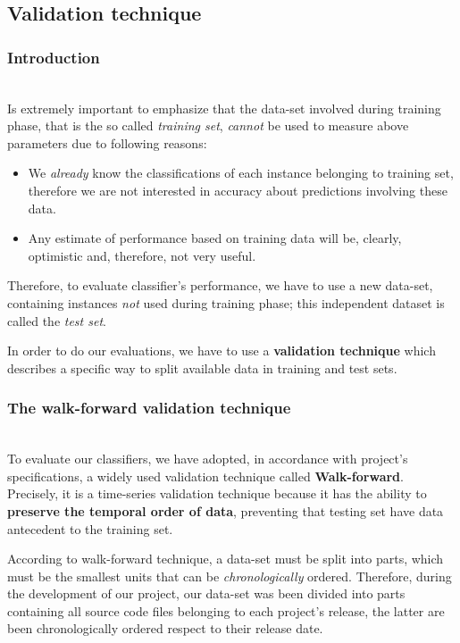\documentclass[sigconf]{acmart}
\begin{document}
\subsection{Validation technique}

\subsubsection{Introduction}
\hfill\\


Is extremely important to emphasize that the data-set involved during training phase, that is the so called \textit{training set}, \textit{cannot} be used to measure above parameters due to following reasons:
\begin{itemize}

\item We \textit{already} know the classifications of each instance belonging to training set, therefore we are not interested in accuracy about predictions involving these data.

\item Any estimate of performance based on training data will be, clearly, optimistic and, therefore, not very useful.
\end{itemize}

Therefore, to evaluate classifier's performance, we have to use a new data-set, containing instances \textit{not} used during training phase; this independent dataset is called the \textit{test set}. 

In order to do our evaluations, we have to use a \textbf{validation technique} which describes a specific way to split available data in training and test sets. 

\subsubsection{The walk-forward validation technique}
\hfill\\

To evaluate our classifiers, we have adopted, in accordance with project's specifications, a widely used validation technique called \textbf{Walk-forward}. Precisely, it is a time-series validation technique because it has the ability to \textbf{preserve the temporal order of data}, preventing that testing set have data antecedent to the training set.

According to walk-forward technique, a data-set must be split into parts, which must be the smallest units that can be \textit{chronologically} ordered. Therefore, during the development of our project, our data-set was been divided into parts containing all source code files belonging to each project's release, the latter are been chronologically ordered respect to their release date.
\end{document}
